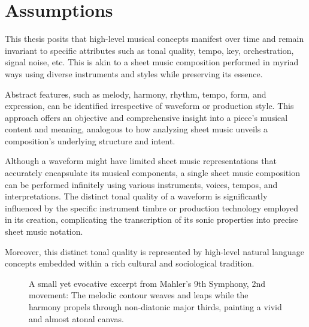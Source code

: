 \section{Assumptions}

This thesis posits that high-level musical concepts manifest over time and remain invariant to specific attributes such as tonal quality, tempo, key, orchestration, signal noise, etc. This is akin to a sheet music composition performed in myriad ways using diverse instruments and styles while preserving its essence.

Abstract features, such as melody, harmony, rhythm, tempo, form, and expression, can be identified irrespective of waveform or production style. This approach offers an objective and comprehensive insight into a piece's musical content and meaning, analogous to how analyzing sheet music unveils a composition's underlying structure and intent.

Although a waveform might have limited sheet music representations that accurately encapsulate its musical components, a single sheet music composition can be performed infinitely using various instruments, voices, tempos, and interpretations. The distinct tonal quality of a waveform is significantly influenced by the specific instrument timbre or production technology employed in its creation, complicating the transcription of its sonic properties into precise sheet music notation.

Moreover, this distinct tonal quality is represented by high-level natural language concepts embedded within a rich cultural and sociological tradition.


\begin{figure}
    \caption[]{\small{A small yet evocative excerpt from Mahler's 9th Symphony, 2nd movement: The melodic contour weaves and leaps while the harmony propels through non-diatonic major thirds, painting a vivid and almost atonal canvas.}}
    \label{fig:mahler}
\end{figure}


